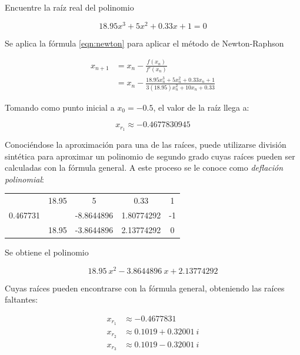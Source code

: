 \begin{ex}
	Encuentre la raíz real del polinomio 

	\[
		18.95x^3 + 5x^2  + 0.33x + 1 = 0
	\]

	\begin{solution}
		Se aplica la fórmula \ref{eqn:newton} para aplicar el método de
		Newton-Raphson

		\begin{align*}
			x_{n+1} &= x_n - \frac{f(x_n)}{f'(x_n)} \\
				&= x_n - \frac{18.95x_n^3 + 5x_n^2 + 0.33x_n +
				1}{3(18.95)x_n^2 + 10x_n + 0.33}
		\end{align*}

		Tomando como punto inicial a \(x_0 = -0.5 \), el valor de la raíz
		llega a:

		\[
			\boxed{x_{r_1} \approx -0.4677830945}
		\]

        Conociéndose la aproximación para una de las raíces, puede utilizarse
        división sintética para aproximar un polinomio de segundo grado cuyas
        raíces pueden ser calculadas con la fórmula general. A este proceso se
        le conoce como \textit{deflación polinomial}:

		\begin{center}
			\begin{tabular}{ c | c c c c }
				& 18.95 & 5 & 0.33 & 1 \\
			        0.467731 & & -8.8644896 & 1.80774292 & -1 \\
			 \hline
				 & 18.95 & -3.8644896 & 2.13774292 & 0
			\end{tabular}
		\end{center}

		Se obtiene el polinomio 

		\[
			18.95\ x^2 - 3.8644896\ x + 2.13774292
		\]
    
        Cuyas raíces pueden encontrarse con la fórmula general, obteniendo las
		raíces faltantes:

		\begin{align*}
			x_{r_1} & \approx -0.4677831 \\
			x_{r_2} & \approx 0.1019 + 0.32001\ i \\
			x_{r_3} & \approx 0.1019 - 0.32001\ i 
		\end{align*}
	\end{solution}

\end{ex}

